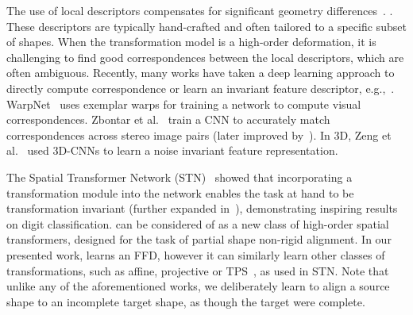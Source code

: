\documentclass[acmtog,timestamp]{acmart}%
\begin{document}
The use of local descriptors compensates for significant geometry differences~\cite{Belongie2002,Zheng2006,Mori2003,Thayananthan2003,ling2007shape}. . These descriptors are typically hand-crafted and often tailored to a specific subset of shapes. When the transformation model is a high-order deformation, it is challenging to find good correspondences between the local descriptors, which are often ambiguous. 
Recently, many works have taken a deep learning approach to directly compute correspondence or learn an invariant feature descriptor, e.g.,~\cite{choy2016universal,simo2015discriminative, tian2017l2}. WarpNet~\cite{kanazawa2016warpnet} uses exemplar warps for training a network to compute visual correspondences. Zbontar et al.~ train a CNN to accurately match correspondences across stereo image pairs (later improved by~\cite{shaked2016improved}). 
In 3D, Zeng et al.~ used 3D-CNNs to learn a noise invariant feature representation. 

The Spatial Transformer Network (STN)~\cite{spatialtransformer} showed that incorporating a transformation module into the network enables the task at hand to be transformation invariant (further expanded in~\cite{li2017dense}), demonstrating inspiring results on digit classification. \ourmethod{} can be considered of as a new class of high-order spatial transformers, designed for the task of partial shape non-rigid alignment. In our presented work, \ourmethod{} learns an FFD, however it can similarly learn other classes of transformations, such as affine, projective or TPS~\cite{TPS}, as used in STN. Note that unlike any of the aforementioned works, we deliberately learn to align a source shape to an incomplete target shape, as though the target were complete.
\end{document}
